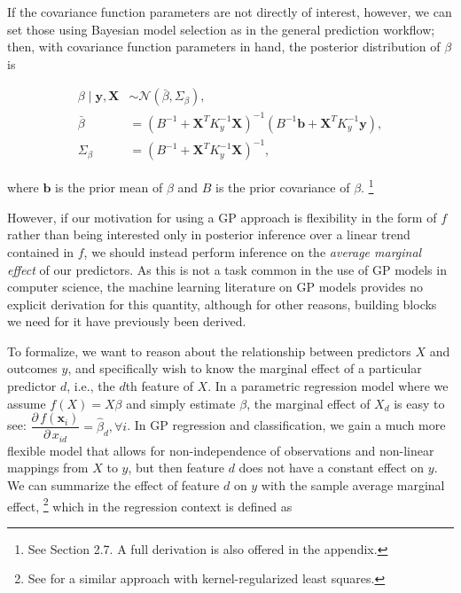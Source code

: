 \documentclass{draft}
\newcommand{\pd}{\ensuremath{\partial \,}}     %
\begin{document}
If the covariance function parameters are not directly of interest, however,
we can set those using Bayesian model selection as in the general prediction workflow;
then, with covariance function parameters in hand, the posterior distribution of \( \beta \) is

\vspace*{-\baselineskip}
\begin{align}
    \beta \mid \mathbf{y}, \mathbf{X} & \sim \mathcal{N}(\bar{\beta}, \Sigma_\beta), \\
    \bar{\beta} & = ( B^{-1} + \mathbf{X}^T K_y^{-1} \mathbf{X} )^{-1} ( B^{-1} \mathbf{b} + \mathbf{X}^T K_y^{-1} \mathbf{y} ), \\
    \Sigma_\beta & = ( B^{-1} + \mathbf{X}^T K_y^{-1} \mathbf{X} )^{-1},
\end{align}

\noindent
where \( \mathbf{b} \) is the prior mean of \( \beta \) and \( B \) is the prior covariance of \( \beta \).%
\footnote{
    See \citet{RasmussenWilliams2006Gaussian} Section 2.7.
    A full derivation is also offered in the appendix.
}

However, if our motivation for using a GP approach is flexibility in the form of \( f \)
rather than being interested only in posterior inference over a linear trend contained in \( f \),
we should instead perform inference on the \emph{average marginal effect} of our predictors.
As this is not a task common in the use of GP models in computer science,
the machine learning literature on GP models provides no explicit derivation for this quantity,
although for other reasons, building blocks we need for it have previously been derived.

To formalize, we want to reason about the relationship between predictors \( X \) and outcomes \( y \),
and specifically wish to know the marginal effect of a particular predictor \( d \), i.e., the \( d \)th feature of \(X \).
In a parametric regression model where we assume \( f \left( X \right) = X\beta \) and simply estimate \( \beta \),
the marginal effect of \( X_d \) is easy to see:
\( \dfrac{\pd f \left( \mathbf{x}_i \right) }{\pd x_{id}} = \hat{\beta}_d, \forall i \).
In GP regression and classification,
we gain a much more flexible model that allows for non-independence of observations and non-linear mappings from \( X \) to \( y \),
but then feature \( d \) does not have a constant effect on \( y \).
We can summarize the effect of feature \( d \) on \( y \) with the sample average marginal effect,%
\footnote{
    See \citet{HainmuellerHazlett2014Kernel} for a similar approach with kernel-regularized least squares.
}
which in the regression context is defined as
\end{document}
